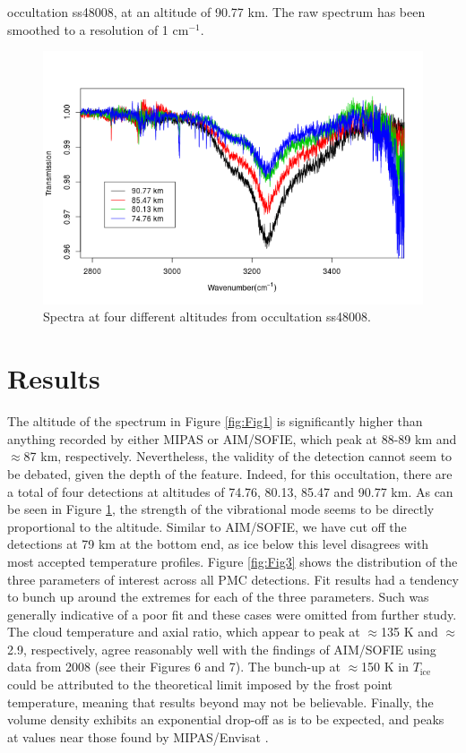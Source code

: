 \documentclass[]{elsarticle}
\begin{document}
occultation ss48008, at an altitude of 90.77 km. The raw spectrum has been smoothed to a resolution of 1 cm$^{-1}$. 

\begin{figure}
	\includegraphics{figs/ss48008_all}
	\caption{Spectra at four different altitudes from occultation ss48008.}
	\label{fig:Fig2}
\end{figure}


\section{Results} \label{sec:results}
The altitude of the spectrum in Figure \ref{fig:Fig1} is significantly higher than anything recorded by either MIPAS or AIM/SOFIE, which peak at 88-89 km and $\approx$87 km, respectively. Nevertheless, the validity of the detection cannot seem to be debated, given the depth of the feature. Indeed, for this occultation, there are a total of four detections at altitudes of 74.76, 80.13, 85.47 and 90.77 km. As can be seen in Figure \ref{fig:Fig2}, the strength of the vibrational mode seems to be directly proportional to the altitude. Similar to AIM/SOFIE, we have cut off the detections at 79 km at the bottom end, as ice below this level disagrees with most accepted temperature profiles. 
Figure \ref{fig:Fig3} shows the distribution of the three parameters of interest across all PMC detections. Fit results had a tendency to bunch up around the extremes for each of the three parameters. Such was generally indicative of a poor fit and these cases were omitted from further study. The cloud temperature and axial ratio, which appear to peak at $\approx$135 K and $\approx$2.9, respectively, agree reasonably well with the findings of AIM/SOFIE \cite{Hervig2010} using data from 2008 (see their Figures 6 and 7). The bunch-up at $\approx$150 K in $T_{\text{ice}}$ could be attributed to the theoretical limit imposed by the frost point temperature, meaning that results beyond may not be believable. Finally, the volume density exhibits an exponential drop-off as is to be expected, and peaks at values near those found by MIPAS/Envisat \cite{Garcia-Comas2016}.  
\end{document}
